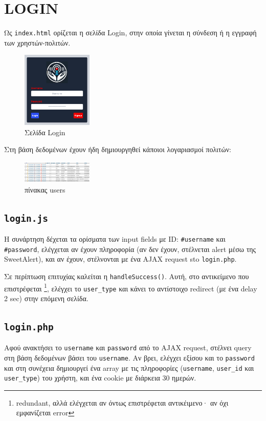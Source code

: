 \section{LOGIN}
    Ως \texttt{index.html} ορίζεται η σελίδα Login, στην οποία γίνεται η σύνδεση ή η εγγραφή των χρηστών-πολιτών.
    \begin{figure}[h!] \noindent \centering
        \includegraphics[width=0.3\textwidth]{img/login}
        \caption{Σελίδα Login}
    \end{figure}

    Στη βάση δεδομένων έχουν ήδη δημιουργηθεί κάποιοι λογαριασμοί πολιτών:

    \begin{figure}[h!] \noindent \centering
        \includegraphics[width=0.3\textwidth]{img/sql-users}
        \caption{πίνακας users}
    \end{figure}

    \subsection{\texttt{login.js}}
        Η συνάρτηση  δέχεται τα ορίσματα των input fields με ID: \texttt{#username} και \texttt{#password},
            ελέγχεται αν έχουν πληροφορία (αν δεν έχουν, στέλνεται alert μέσω της SweetAlert), και αν έχουν,
            στέλνονται με ένα AJAX request sto \texttt{login.php}.

        Σε περίπτωση επιτυχίας καλείται η \texttt{handleSuccess()}.
        Αυτή, στο αντικείμενο που επιστρέφεται \footnote{redundant, αλλά ελέγχεται αν όντως επιστρέφεται αντικέιμενο· αν όχι εμφανίζεται error},
            ελέγχει το \texttt{user\_type} και κάνει το αντίστοιχο redirect (με ένα delay 2 sec) στην επόμενη σελίδα.

    \subsection{\texttt{login.php}}
        Αφού ανακτήσει το \texttt{username} και \texttt{password} από το AJAX request, στέλνει query στη βάση δεδομένων βάσει του \texttt{username}.
        Αν βρει, ελέγχει εξίσου και το \texttt{password} και στη συνέχεια δημιουργεί ένα array με τις πληροφορίες (\texttt{username}, \texttt{user\_id} και \texttt{user\_type}) του χρήστη, και ένα cookie με διάρκεια 30 ημερών.

